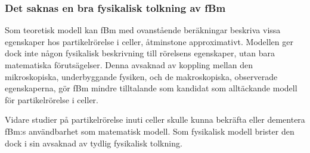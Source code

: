 \subsubsection{Det saknas en bra fysikalisk tolkning av fBm}

Som teoretisk modell kan fBm med ovanstående beräkningar beskriva vissa egenskaper hos partikelrörelse i celler, åtminstone approximativt. Modellen ger dock inte någon fysikalisk beskrivning till rörelsens egenskaper, utan bara matematiska förutsägelser. 
Denna avsaknad av koppling mellan den mikroskopiska, underbyggande fysiken, och de makroskopiska, observerade egenskaperna, gör fBm mindre tilltalande som kandidat som alltäckande modell för partikelrörelse i celler.

Vidare studier på partikelrörelse inuti celler skulle kunna bekräfta eller dementera fBm:s användbarhet som matematisk modell. Som fysikalisk modell brister den dock i sin avsaknad av tydlig fysikalisk tolkning.






